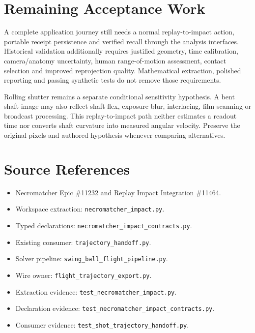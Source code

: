 \documentclass[11pt]{article}
\newcommand{\code}[1]{\nolinkurl{#1}}
\begin{document}
\section*{Remaining Acceptance Work}
A complete application journey still needs a normal replay-to-impact action,
portable receipt persistence and verified recall through the analysis interfaces.
Historical validation additionally requires justified geometry, time calibration,
camera/anatomy uncertainty, human range-of-motion assessment, contact selection
and improved reprojection quality. Mathematical extraction, polished reporting
and passing synthetic tests do not remove those requirements.

Rolling shutter remains a separate conditional sensitivity hypothesis. A bent
shaft image may also reflect shaft flex, exposure blur, interlacing, film scanning
or broadcast processing. This replay-to-impact path neither estimates a readout
time nor converts shaft curvature into measured angular velocity. Preserve the
original pixels and authored hypothesis whenever comparing alternatives.

\section*{Source References}
\begin{itemize}
\item \href{https://github.com/D-sorganization/UpstreamDrift/issues/11232}{Necromatcher Epic \#11232} and
\href{https://github.com/D-sorganization/UpstreamDrift/issues/11464}{Replay Impact Integration \#11464}.
\item Workspace extraction: \code{necromatcher_impact.py}.
\item Typed declarations: \code{necromatcher_impact_contracts.py}.
\item Existing consumer: \code{trajectory_handoff.py}.
\item Solver pipeline: \code{swing_ball_flight_pipeline.py}.
\item Wire owner: \code{flight_trajectory_export.py}.
\item Extraction evidence: \code{test_necromatcher_impact.py}.
\item Declaration evidence: \code{test_necromatcher_impact_contracts.py}.
\item Consumer evidence: \code{test_shot_trajectory_handoff.py}.
\end{itemize}
\end{document}
